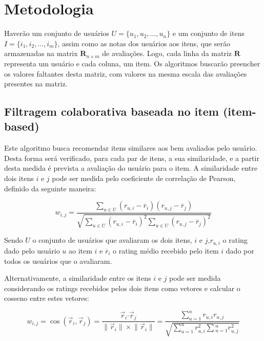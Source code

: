 \documentclass[12pt,a4paper,header]{abnt}
\begin{document}
\section{Metodologia}

Haverão um conjunto de usuários $U = \{u_1, u_2, \ldots, u_n\}$ e um conjunto de itens $I = \{i_1, i_2, \ldots, i_m \}$, assim como as notas dos usuários aos itens, que serão armazenadas na matrix $\boldsymbol{R}_{n \times m}$ de avaliações\cite{hahsler2015recommenderlab}. Logo, cada linha da matriz $\boldsymbol{R}$ representa um usuário e cada coluna, um item. Os algoritmos buscarão preencher os valores faltantes desta matriz, com valores na mesma escala das avaliações presentes na matriz\cite{takahashi2015estudo}.

\subsection{Filtragem colaborativa baseada no item (item-based)}

Este algoritmo busca recomendar itens similares aos bem avaliados pelo usuário. Desta forma será verificado, para cada par de itens, a sua similaridade, e a partir desta medida é prevista a avaliação do usuário para o item. A similaridade entre dois itens $i$ e $j$ pode ser medida pelo coeficiente de correlação de Pearson, definido da seguinte maneira\cite{melville2011recommender}:

\begin{equation}
w_{i, j} = \frac{\sum_{u \in U}{(r_{u, i} - \overline{r}_i ) ( r_{u, j} - \overline{r}_j )}}{\sqrt{\sum_{u \in U}{(r_{u, i} - \overline{r}_i )^2} \sum_{u \in U}{(r_{u, j} - \overline{r}_j )^2}}}
\end{equation}

Sendo $U$ o conjunto de usuários que avaliaram os dois itens, $i$ e $j$,$r_{u, i}$ o rating dado pelo usuário $u$ ao item $i$ e $\overline{r}_i$ o rating médio recebido pelo item $i$ dado por todos os usuários que o avaliaram.

Alternativamente, a similaridade entre os itens $i$ e $j$ pode ser medida considerando os ratings recebidos pelos dois itens como vetores e calcular o cosseno entre estes vetores\cite{sarwar2001item}:

\begin{equation}
w_{i, j} = \cos({\vec{r}_i, \vec{r}_j}) = \frac{\vec{r}_i \boldsymbol{\cdot} \vec{r}_j}{\lVert \vec{r}_i\rVert \times \lVert \vec{r}_i\rVert} = \frac{\sum_{u=1}^{n}{r_{u, i} r_{u, j}}}{\sqrt{\sum_{u=1}^{n}{r^2_{u, i}} \sum{_{u=1}^{n}{r^2_{u, j}}}}}
\end{equation}
\end{document}
